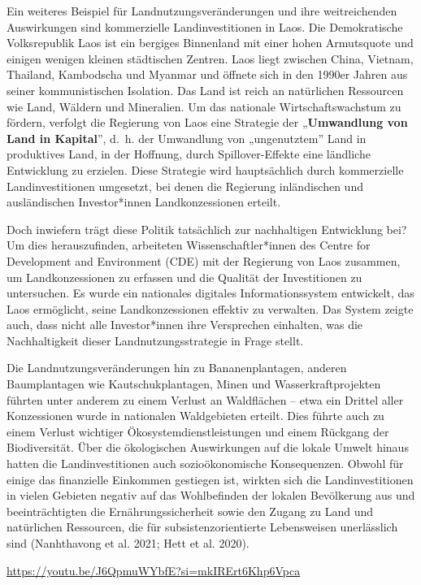 \documentclass[
  nswissgerman,
  a4paper,
  DIV=11,
  numbers=noendperiod,
  oneside,
  openany]{scrreprt}
\begin{document}
\begin{tcolorbox}[enhanced jigsaw, arc=.35mm, bottomrule=.15mm, bottomtitle=1mm, breakable, colback=white, colbacktitle=quarto-callout-tip-color!10!white, colframe=quarto-callout-tip-color-frame, coltitle=black, left=2mm, leftrule=.75mm, opacityback=0, opacitybacktitle=0.6, rightrule=.15mm, title={Beispiel: Landinvestitionen in Laos}, titlerule=0mm, toprule=.15mm, toptitle=1mm]

Ein weiteres Beispiel für Landnutzungsveränderungen und ihre
weitreichenden Auswirkungen sind kommerzielle Landinvestitionen in Laos.
Die Demokratische Volksrepublik Laos ist ein bergiges Binnenland mit
einer hohen Armutsquote und einigen wenigen kleinen städtischen Zentren.
Laos liegt zwischen China, Vietnam, Thailand, Kambodscha und Myanmar und
öffnete sich in den 1990er Jahren aus seiner kommunistischen Isolation.
Das Land ist reich an natürlichen Ressourcen wie Land, Wäldern und
Mineralien. Um das nationale Wirtschaftswachstum zu fördern, verfolgt
die Regierung von Laos eine Strategie der „\textbf{Umwandlung von Land
in Kapital}'', d.~h. der Umwandlung von „ungenutztem'' Land in
produktives Land, in der Hoffnung, durch Spillover-Effekte eine
ländliche Entwicklung zu erzielen. Diese Strategie wird hauptsächlich
durch kommerzielle Landinvestitionen umgesetzt, bei denen die Regierung
inländischen und ausländischen Investor*innen Landkonzessionen erteilt.

Doch inwiefern trägt diese Politik tatsächlich zur nachhaltigen
Entwicklung bei? Um dies herauszufinden, arbeiteten
Wissenschaftler*innen des Centre for Development and Environment (CDE)
mit der Regierung von Laos zusammen, um Landkonzessionen zu erfassen und
die Qualität der Investitionen zu untersuchen. Es wurde ein nationales
digitales Informationssystem entwickelt, das Laos ermöglicht, seine
Landkonzessionen effektiv zu verwalten. Das System zeigte auch, dass
nicht alle Investor*innen ihre Versprechen einhalten, was die
Nachhaltigkeit dieser Landnutzungsstrategie in Frage stellt.

Die Landnutzungsveränderungen hin zu Bananenplantagen, anderen
Baumplantagen wie Kautschukplantagen, Minen und Wasserkraftprojekten
führten unter anderem zu einem Verlust an Waldflächen -- etwa ein
Drittel aller Konzessionen wurde in nationalen Waldgebieten erteilt.
Dies führte auch zu einem Verlust wichtiger Ökosystemdienstleistungen
und einem Rückgang der Biodiversität. Über die ökologischen Auswirkungen
auf die lokale Umwelt hinaus hatten die Landinvestitionen auch
sozioökonomische Konsequenzen. Obwohl für einige das finanzielle
Einkommen gestiegen ist, wirkten sich die Landinvestitionen in vielen
Gebieten negativ auf das Wohlbefinden der lokalen Bevölkerung aus und
beeinträchtigten die Ernährungssicherheit sowie den Zugang zu Land und
natürlichen Ressourcen, die für subsistenzorientierte Lebensweisen
unerlässlich sind (Nanhthavong et al. 2021; Hett et al. 2020).

\url{https://youtu.be/J6QpmuWYbfE?si=mkIRErt6Khp6Vpca}

\end{tcolorbox}
\end{document}
